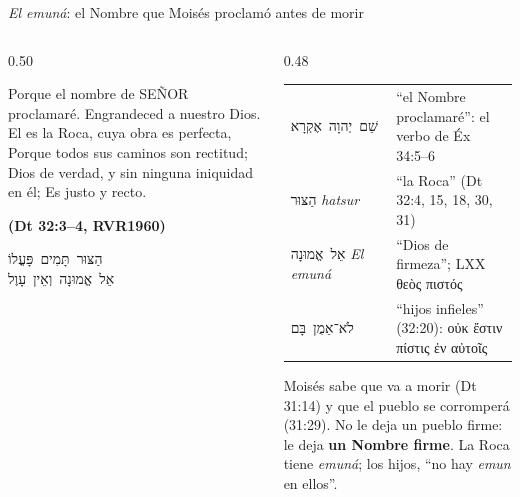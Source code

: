 \documentclass[hyperref={bookmarks=false},aspectratio=169]{beamer}
\newcommand{\heb}[1]{\mbox{\foreignlanguage{hebrew}{#1}}}
\newcommand{\grc}[1]{\foreignlanguage{ancientgreek}{#1}}
\newcommand{\SENOR}{S{\fontsize{0.78em}{1em}\selectfont EÑOR}}
\newcommand{\fuente}[1]{\par\hfill{\upshape\bfseries\footnotesize\textcolor{azul}{#1}}}
\newcommand{\destacar}[1]{\textbf{\textcolor{azul}{#1}}}
\begin{document}
\begin{frame}{\emph{El emuná}: el Nombre que Moisés proclamó antes de morir}
\begin{columns}[t,onlytextwidth]
\begin{column}{0.50\textwidth}
\begin{cita}Porque el nombre de \SENOR{} proclamaré. Engrandeced a nuestro Dios. El es la Roca, cuya obra es perfecta, Porque todos sus caminos son rectitud; Dios de verdad, y sin ninguna iniquidad en él; Es justo y recto.\fuente{(Dt 32:3--4, RVR1960)}\end{cita}
\begin{center}\small\heb{הַצּוּר תָּמִים פָּעֳלוֹ}\\ \heb{אֵל אֱמוּנָה וְאֵין עָוֶל}\end{center}
\end{column}
\begin{column}{0.48\textwidth}\scriptsize
\renewcommand{\arraystretch}{1.15}
\begin{tabular}{@{}>{\RaggedRight\arraybackslash}p{2.0cm}>{\RaggedRight\arraybackslash}p{3.7cm}@{}}
\toprule
\heb{שֵׁם יְהוָה אֶקְרָא} & ``el Nombre proclamaré'': el verbo de Éx 34:5--6 \\
\heb{הַצּוּר} \emph{hatsur} & ``la Roca'' (Dt 32:4, 15, 18, 30, 31) \\
\heb{אֵל אֱמוּנָה} \emph{El emuná} & ``Dios de firmeza''; LXX \grc{θεὸς πιστός} \\
\heb{לֹא־אֵמֻן בָּם} & ``hijos infieles'' (32:20): \grc{οὐκ ἔστιν πίστις ἐν αὐτοῖς} \\
\bottomrule
\end{tabular}\par\medskip
\small Moisés sabe que va a morir (Dt 31:14) y que el pueblo se corromperá (31:29). No le deja un pueblo firme: le deja \destacar{un Nombre firme}. La Roca tiene \emph{emuná}; los hijos, ``no hay \emph{emun} en ellos''.
\end{column}
\end{columns}
\end{frame}
\end{document}
